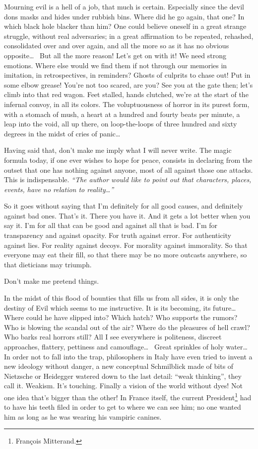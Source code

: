 Mourning evil is a hell of a job, that much is certain. Especially since the devil dons masks and hides under rubbish bins. Where did he go again, that one? In which black hole blacker than him? One could believe oneself in a great strange struggle, without real adversaries; in a great affirmation to be repeated, rehashed, consolidated over and over again, and all the more so as it has no obvious opposite\dots~ But all the more reason! Let's get on with it!  We need strong emotions. Where else would we find them if not through our memories in imitation, in retrospectives, in reminders? Ghosts of culprits to chase out! Put in some elbow grease! You're not too scared, are you? See you at the gate then; let's climb into that red wagon. Feet stalled, hands clutched, we're at the start of the infernal convoy, in all its colors. The voluptuousness of horror in its purest form, with a stomach of mush, a heart at a hundred and fourty beats per minute, a leap into the void, all up there, on loop-the-loops of three hundred and sixty degrees in the midst of cries of panic\dots~

Having said that, don't make me imply what I will never write. The magic formula today, if one ever wishes to hope for peace, consists in declaring from the outset that one has nothing against anyone, most of all against those one attacks. This is indispensable. \textit{``The author would like to point out that characters, places, events, have no relation to reality\dots''}

So it goes without saying that I'm definitely for all good causes, and definitely against bad ones. That's it. There you have it. And it gets a lot better when you say it. I'm for all that can be good and against all that is bad. I'm for transparency and against opacity. For truth against error. For authenticity against lies. For reality against decoys. For morality against immorality. So that everyone may eat their fill, so that there may be no more outcasts anywhere, so that dieticians may triumph.

Don't make me pretend things.

In the midst of this flood of bounties that fills us from all sides, it is only the destiny of Evil which seems to me instructive. It is its becoming, its future\dots~ Where could he have slipped into? Which hatch? Who supports the rumors?  Who is blowing the scandal out of the air? Where do the pleasures of hell crawl?  Who barks real horrors still?  All I see everywhere is politeness, discreet approaches, flattery, pettiness and camouflage\dots~ Great sprinkles of holy water\dots~ In order not to fall into the trap, philosophers in Italy have even tried to invent a new ideology without danger, a new conceptual Schmilblick made of bits of Nietzsche or Heidegger watered down to the last detail: ``weak thinking'', they call it. Weakism. It's touching. Finally a vision of the world without dyes! Not one idea that's bigger than the other! In France itself, the current President\footnote{Fran\c{c}ois Mitterand.} had to have his teeth filed in order to get to where we can see him; no one wanted him as long as he was wearing his vampiric canines.

